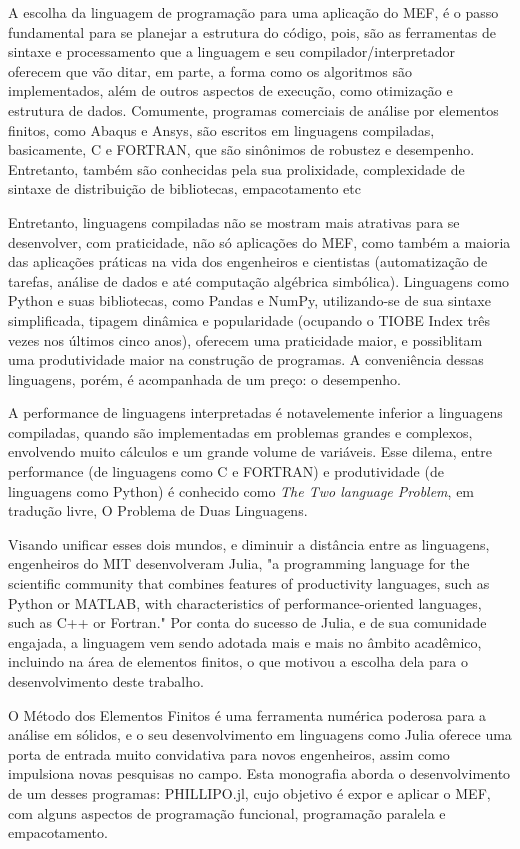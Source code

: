 A escolha da linguagem de programação para uma aplicação do MEF, é o passo fundamental para se planejar a estrutura do código, pois, são as ferramentas de sintaxe e processamento que a linguagem e seu compilador/interpretador oferecem que vão ditar, em parte, a forma como os algoritmos são implementados, além de outros aspectos de execução, como otimização e estrutura de dados. Comumente, programas comerciais de análise por elementos finitos, como Abaqus e Ansys, são escritos em linguagens compiladas, basicamente, C e FORTRAN, que são sinônimos de robustez e desempenho. Entretanto, também são conhecidas pela sua prolixidade, complexidade de sintaxe de distribuição de bibliotecas, empacotamento etc 

Entretanto, linguagens compiladas não se mostram mais atrativas para se desenvolver, com praticidade, não só aplicações do MEF, como também a maioria das aplicações práticas na vida dos engenheiros e cientistas (automatização de tarefas, análise de dados e até computação algébrica simbólica). Linguagens como Python e suas bibliotecas, como Pandas e NumPy, utilizando-se de sua sintaxe simplificada, tipagem dinâmica e popularidade (ocupando o TIOBE Index três vezes nos últimos cinco anos), oferecem uma praticidade maior, e possiblitam uma produtividade maior na construção de programas. A conveniência dessas linguagens, porém, é acompanhada de um preço: o desempenho.

A performance de linguagens interpretadas é notavelemente inferior a linguagens compiladas, quando são implementadas em problemas grandes e complexos, envolvendo muito cálculos e um grande volume de variáveis. Esse dilema, entre performance (de linguagens como C e FORTRAN) e produtividade (de linguagens como Python) é conhecido como \emph{The Two language Problem}, em tradução livre, O Problema de Duas Linguagens.

Visando unificar esses dois mundos, e diminuir a distância entre as linguagens, engenheiros do MIT desenvolveram Julia, "a programming language for the scientific community that combines features of productivity languages, such as Python or MATLAB, with characteristics of performance-oriented languages, such as C++ or Fortran." \cite[tradução livre]{Bezanson} Por conta do sucesso de Julia, e de sua comunidade engajada, a linguagem vem sendo adotada mais e mais no âmbito acadêmico, incluindo na área de elementos finitos, o que motivou a escolha dela para o desenvolvimento deste trabalho.

O Método dos Elementos Finitos é uma ferramenta numérica poderosa para a análise em sólidos, e o seu desenvolvimento em linguagens como Julia oferece uma porta de entrada muito convidativa para novos engenheiros, assim como impulsiona novas pesquisas no campo. Esta monografia aborda o desenvolvimento de um desses programas: PHILLIPO.jl, cujo objetivo é expor e aplicar o MEF, com alguns aspectos de programação funcional, programação paralela e empacotamento.


